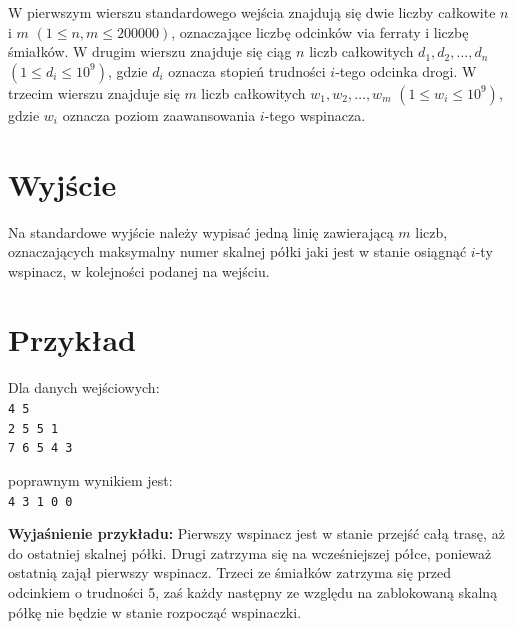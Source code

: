 \documentclass[10pt]{article}
\begin{document}
    W pierwszym wierszu standardowego wejścia znajdują się dwie liczby całkowite $n$ i $m$ $(1 \leq n, m \leq 200000)$, oznaczające liczbę odcinków via ferraty i liczbę śmiałków. W drugim wierszu znajduje się ciąg $n$ liczb całkowitych $d_{1}, d_{2}, \ldots, d_{n}$ $(1 \leq d_{i} \leq 10^{9})$, gdzie $d_{i}$ oznacza stopień trudności $i$-tego odcinka drogi. W trzecim wierszu znajduje się $m$ liczb całkowitych $w_{1}, w_{2}, \ldots, w_{m}$ $(1 \leq w_{i} \leq 10^{9})$, gdzie $w_{i}$ oznacza poziom zaawansowania $i$-tego wspinacza.


    \section*{Wyjście}
    
    Na standardowe wyjście należy wypisać jedną linię zawierającą $m$ liczb, oznaczających maksymalny numer skalnej półki jaki jest w stanie osiągnąć $i$-ty wspinacz, w kolejności podanej na wejściu.


    \section*{Przykład}
    
    \noindent
    \begin{minipage}[t]{0.5\textwidth}
        Dla danych wejściowych:\vspace{1ex}\\
        \texttt{4 5\\2 5 5 1\\7 6 5 4 3}
    \end{minipage}
    \begin{minipage}[t]{0.5\textwidth}
        poprawnym wynikiem jest:\vspace{1ex}\\
        \texttt{4 3 1 0 0}
    \end{minipage}
    
    \vspace{2ex}
    \noindent\textbf{Wyjaśnienie przykładu:} Pierwszy wspinacz jest w stanie przejść całą trasę, aż do ostatniej skalnej półki. Drugi zatrzyma się na wcześniejszej półce, ponieważ ostatnią zajął pierwszy wspinacz. Trzeci ze śmiałków zatrzyma się przed odcinkiem o trudności 5, zaś każdy następny ze względu na zablokowaną skalną półkę nie będzie w stanie rozpocząć wspinaczki.
    
\end{document}
